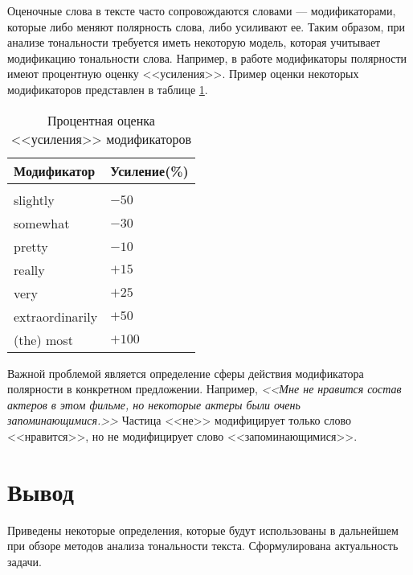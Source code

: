 Оценочные слова в тексте часто сопровождаются словами --- модификаторами, которые либо меняют полярность слова, либо усиливают ее. Таким образом, при анализе тональности требуется иметь некоторую модель, которая учитывает модификацию тональности слова. Например, в работе \cite{modf} модификаторы полярности имеют процентную оценку <<усиления>>. Пример оценки некоторых модификаторов представлен в таблице \ref{modifiers}.
\captionsetup{singlelinecheck = false, justification=raggedleft}
\begin{table}[H]
	\caption{Процентная оценка <<усиления>> модификаторов}
	\renewcommand{\arraystretch}{1.2}
	\centering
	\begin{tabular}{ll}
		Модификатор & Усиление(\%) \\ \hline\hline
		& \\ 
		slightly & $-50$\\
		somewhat  & $-30$\\
		pretty  &$-10$\\
		really &$+15$\\
		very&$+25$\\
		extraordinarily&$+50$\\
		(the) most &$+100$\\ 
	\end{tabular}
	\label{modifiers}
\end{table}
Важной проблемой является определение сферы действия модификатора полярности в конкретном предложении. Например, \textit{<<Мне не нравится состав актеров в этом фильме, но некоторые актеры были очень запоминающимися.>>} Частица <<не>> модифицирует только слово <<нравится>>, но не модифицирует слово <<запоминающимися>>.
\section{Вывод}
Приведены некоторые определения, которые будут использованы в дальнейшем при обзоре методов анализа тональности текста. Сформулирована актуальность задачи.